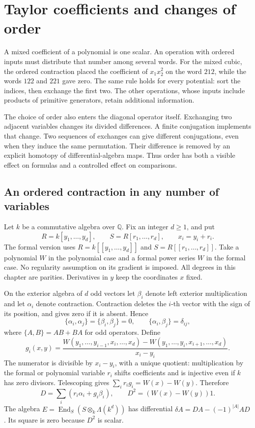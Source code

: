 \chapter{Taylor coefficients and changes of order}
\label{chap:ordered-taylor}

A mixed coefficient of a polynomial is one scalar. An operation with
ordered inputs must distribute that number among several words.
For the mixed cubic, the ordered contraction placed the coefficient
of \(x_1x_2^2\) on the word \(212\), while the words \(122\) and
\(221\) gave zero. The same rule holds for every potential: sort
the indices, then exchange the first two. The other operations,
whose inputs include products of primitive generators, retain
additional information.

The choice of order also enters the diagonal operator itself.
Exchanging two adjacent variables changes its divided differences.
A finite conjugation implements that change. Two sequences of
exchanges can give different conjugations, even when they induce
the same permutation. Their difference is removed by an explicit
homotopy of differential-algebra maps. Thus order has both a
visible effect on formulas and a controlled effect on comparisons.

\section{An ordered contraction in any number of variables}
\label{sec:ot-contraction}

Let \(k\) be a commutative algebra over \(\mathbb Q\). Fix an
integer \(d\ge1\), and put
\[
 R=k[y_1,\ldots,y_d],\qquad S=R[r_1,\ldots,r_d],
 \qquad x_i=y_i+r_i.
\]
The formal version uses \(R=k[[y_1,\ldots,y_d]]\) and
\(S=R[[r_1,\ldots,r_d]]\). Take a polynomial \(W\) in the
polynomial case and a formal power series \(W\) in the formal case.
No regularity assumption on its gradient is imposed.
All degrees in this chapter are parities. Derivatives in \(y\)
keep the coordinates \(x\) fixed.

On the exterior algebra of \(d\) odd vectors let \(\beta_i\)
denote left exterior multiplication and let \(\alpha_i\) denote
contraction. Contraction deletes the \(i\)-th vector with the
sign of its position, and gives zero if it is absent. Hence
\[
 \{\alpha_i,\alpha_j\}=\{\beta_i,\beta_j\}=0,\qquad
 \{\alpha_i,\beta_j\}=\delta_{ij},
\]
where \(\{A,B\}=AB+BA\) for odd operators.
Define
\[
 g_i(x,y)=
 \frac{W(y_1,\ldots,y_{i-1},x_i,\ldots,x_d)
       -W(y_1,\ldots,y_i,x_{i+1},\ldots,x_d)}
      {x_i-y_i}.
\]
The numerator is divisible by \(x_i-y_i\), with a unique quotient:
multiplication by the formal or polynomial variable \(r_i\)
shifts coefficients and is injective even if \(k\) has zero divisors.
Telescoping gives \(\sum_i r_i g_i=W(x)-W(y)\). Therefore
\[
 D=\sum_i(r_i\alpha_i+g_i\beta_i),\qquad
 D^2=(W(x)-W(y))1.
\]
The algebra \(E=\operatorname{End}_S(S\otimes_k\Lambda(k^d))\)
has differential
\(\delta A=DA-(-1)^{|A|}AD\). Its square is zero because
\(D^2\) is scalar.

